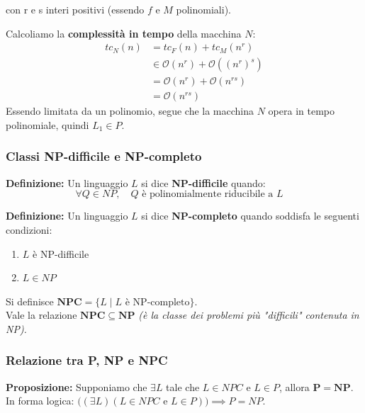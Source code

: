 con r e s interi positivi (essendo $f$ e $M$ polinomiali).

\vspace{0.3cm}
Calcoliamo la \textbf{complessità in tempo} della macchina $N$:
\begin{align*}
    tc_N(n) &= tc_F(n) + tc_M(n^r) \\
    &\in \mathcal{O}(n^r) + \mathcal{O}((n^r)^s) \\
    &= \mathcal{O}(n^r) + \mathcal{O}(n^{rs}) \\
    &= \mathcal{O}(n^{rs})
\end{align*}
Essendo limitata da un polinomio, segue che la macchina $N$ opera in tempo polinomiale, quindi $L_1 \in P$.


\vspace{0.8cm}

\subsubsection{Classi NP-difficile e NP-completo}

\textbf{Definizione:} Un linguaggio $L$ si dice \textbf{NP-difficile} quando:
$$ \forall Q \in NP, \quad Q \text{ è polinomialmente riducibile a } L \quad  $$

\vspace{0.4cm}
\textbf{Definizione:} Un linguaggio $L$ si dice \textbf{NP-completo} quando soddisfa le seguenti condizioni:
\begin{enumerate}
    \item $L$ è NP-difficile
    \item $L \in NP$
\end{enumerate}

Si definisce $\mathbf{NPC} = \{ L \mid L \text{ è NP-completo} \}$. \\
Vale la relazione $\mathbf{NPC \subseteq NP}$ \textit{(è la classe dei problemi più "difficili" contenuta in NP).}


\vspace{0.8cm}

\subsubsection{Relazione tra P, NP e NPC}

\textbf{Proposizione:} Supponiamo che $\exists L$ tale che $L \in NPC$ e $L \in P$, allora $\mathbf{P = NP}$. \\
In forma logica: $\Big( (\exists L) (L \in NPC \text{ e } L \in P) \Big) \implies P = NP$.

